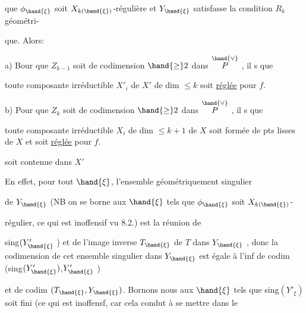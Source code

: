 




que $\phi_{\hand{\xi}}$ soit $X_{k(\hand{\xi})}$-régulière et $Y_{\hand{\xi}}$ satisfasse la condition $R_k$ géométri-%

que. Alors:

a) Bour que $Z_{k-1}$ soit de codimension $\hand{\geq} 2$ dans $\overset{\hand{\vee}}{P}$ , il  s que
 
toute composante irréductible $X'_i$ de $X'$ de dim $\leq k$ soit \uline{réglée} pour $f$. 

b) Pour que $Z_k$ soit de codimension $\hand{\geq} 2$ dans $\overset{\hand{\vee}}{P}$ , il  s que

toute composante irréductible 
$X_i$ de dim $\leq k+1$ de $X$ soit formée de pts lisses de $X$ et soit \uline{réglée} pour $f$.



 
soit contenue dans $X'$

En effet, pour tout $\hand{\xi}$, l'ensemble géométriquement singulier

de $Y_{\hand{\xi}}$  (NB on se borne aux $\hand{\xi}$ tels que $\phi_{\hand{\xi}}$ soit $X_{k(\hand{\xi})}$-

régulier, ce qui est inoffensif vu 8.2.) est la réunion de

sing$(Y'_{\hand{\xi}}$ ) et de l'image inverse $T_{\hand{\xi}}$ de $T$ dans $Y_{\hand{\xi}}$ , donc la codimension
de cet ensemble singulier dans $Y_{\hand{\xi}}$ est égale à l'inf de codim (sing$(Y'_{\hand{\xi}})$,$Y'_{\hand{\xi}}$ )

et de codim $(T_{\hand{\xi}},Y_{\hand{\xi}})$. Bornons nous aux $\hand{\xi}$ tels que \hand{)}
\placedmargin{$*$} sing$(Y'_\xi)$ soit fini
(ce qui est inoffensf, car  cela condut à se mettre dans le

